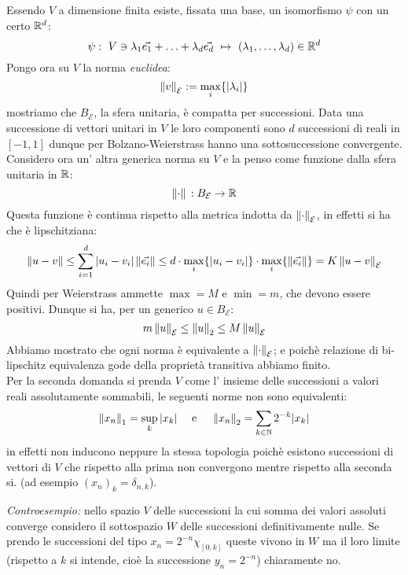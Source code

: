  Essendo $V$ a dimensione finita esiste, fissata una base, un isomorfismo $\psi$ con un certo $\mathbb{R}^d$:
$$ \psi: \ V\ni\lambda_1\vec{e_1}+\ldots+\lambda_d\vec{e_d}\ \mapsto\  (\lambda_1,\ldots,\lambda_d)\in\RR^d $$
Pongo ora su $V$ la norma  {\it euclidea}:
$$ \left \| v \right\|_{\mathcal{E}}:=\max_i\{\vert{\lambda_i}\vert\} $$
mostriamo che $B_{\mathcal{E}}$, la sfera unitaria, è compatta per successioni. Data una successione di vettori unitari in $V$ le loro componenti sono $d$ successioni di reali in $[-1,1]$ dunque per Bolzano-Weierstrass hanno una sottosuccessione convergente. Considero ora un' altra generica norma su $V$ e la penso come funzione dalla sfera unitaria in $\mathbb{R}$:
$$\left \| \cdot \right\|\, : B_{\mathcal{E}}\rightarrow \mathbb{R}$$
Questa funzione è continua rispetto alla metrica indotta da $\left \| \cdot \right\|_{\mathcal{E}}$, in effetti si ha che è lipschitziana:
$$ \left \| u-v \right\|\leq\sum_{i=1}^{d}\vert{u_i-v_i}\vert\left \| \vec{e_i} \right\|\leq d\cdot\max_i\{\vert{u_i-v_i}\vert\}\cdot \max_i\{\left \| \vec{e_i} \right\|\}=K \left \| u-v \right\|_{\mathcal{E}} $$
Quindi per Weierstrass ammette $\max=M$ e $\min=m$, che devono essere positivi. Dunque si ha, per un generico $u\in B_{\mathcal{E}}$: 
$$m\left \| u \right\|_{\mathcal{E}}\leq \left \| u \right\|_2\leq M\left \| u \right\|_{\mathcal{E}}$$
Abbiamo mostrato che ogni norma è equivalente a $\left \| \cdot \right\|_{\mathcal{E}}$; e poichè relazione di bi-lipschitz equivalenza gode della proprietà transitiva abbiamo finito.\\ 
Per la seconda domanda si prenda $V$ come l' insieme delle successioni a valori reali assolutamente sommabili, le seguenti norme non sono equivalenti:
$$ \left \| x_n \right\|_1=\sup_k \vert{x_k}\vert \quad \mbox{      e       }\quad \left \| x_n \right\|_2=\sum_{k\in\mathbb{N}} 2^{-k}\vert{x_k}\vert $$
in effetti non inducono neppure la stessa topologia poichè esistono successioni di vettori di $V$ che rispetto alla prima non convergono mentre rispetto alla seconda si. (ad esempio $(x_n)_k=\delta_{n,k}$).

 {\it Controesempio:} nello spazio $V$ delle successioni la cui somma dei valori assoluti converge considero il sottospazio $W$ delle successioni definitivamente nulle. Se prendo le successioni del tipo $x_n=2^{-n}\chi_{[0,k]}$ queste vivono in $W$ ma il loro limite (rispetto a $k$ si intende, cioè la successione $y_n=2^{-n}$) chiaramente no. 

